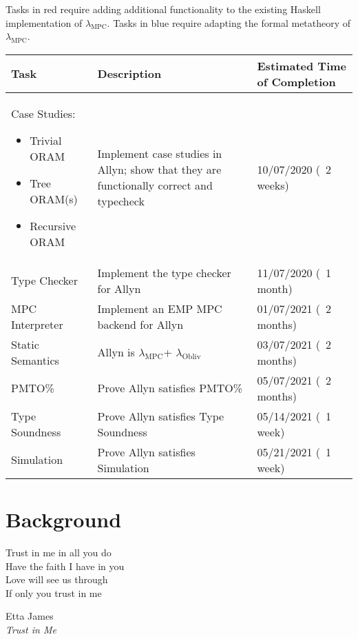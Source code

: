 \documentclass{report}
\newcommand{\lang}{Allyn\xspace}
\newcommand{\mpc}{\ensuremath{\lambda_{\mathrm{MPC}}}\xspace}
\newcommand{\obliv}{\ensuremath{\lambda_{\mathrm{Obliv}}}\xspace}
\begin{document}
Tasks in \colorbox{implColor}{red} require adding additional functionality to the existing Haskell implementation of \mpc.
Tasks in \colorbox{theoryColor}{blue} require adapting the formal metatheory of \mpc. \\

\begin{tabular}{|p{}|p{}|p{}|}
  \hline
  \textbf{Task} & \textbf{Description} & \textbf{Estimated Time of Completion} \\
  \hline
  \rowcolor{implColor}
  Case Studies:
  \begin{itemize}
  \item Trivial ORAM
  \item Tree ORAM(s)
  \item Recursive ORAM
  \end{itemize}    & Implement case studies in \lang;
  show that they are functionally correct and typecheck & 10/07/2020 (~2 weeks)  \\ \hline
  \rowcolor{implColor}
  Type Checker     & Implement the type checker for \lang                  & 11/07/2020 (~1 month)  \\ \hline
  \rowcolor{implColor}
  MPC Interpreter  & Implement an EMP MPC backend for \lang                & 01/07/2021 (~2 months) \\ \hline
  \rowcolor{theoryColor}
  Static Semantics & \lang is \mpc + \obliv                                & 03/07/2021 (~2 months) \\ \hline
  \rowcolor{theoryColor}
  PMTO\%           & Prove \lang satisfies PMTO\%                          & 05/07/2021 (~2 months) \\ \hline
  \rowcolor{theoryColor}
  Type Soundness   & Prove \lang satisfies Type Soundness                  & 05/14/2021 (~1 week)   \\ \hline
  \rowcolor{theoryColor}
  Simulation       & Prove \lang satisfies Simulation                      & 05/21/2021 (~1 week)   \\ \hline
\end{tabular}


\chapter{Background}
\epigraph{Trust in me in all you do \\
          Have the faith I have in you \\
          Love will see us through \\
          If only you trust in me}{
            Etta James \\
            \emph{Trust in Me}}
\end{document}
